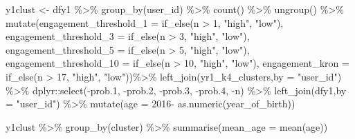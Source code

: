 \documentclass[
]{article}
\newenvironment{Shaded}{\begin{snugshade}}{\end{snugshade}}
\newcommand{\AttributeTok}[1]{\textcolor[rgb]{0.77,0.63,0.00}{#1}}
\newcommand{\DecValTok}[1]{\textcolor[rgb]{0.00,0.00,0.81}{#1}}
\newcommand{\FloatTok}[1]{\textcolor[rgb]{0.00,0.00,0.81}{#1}}
\newcommand{\FunctionTok}[1]{\textcolor[rgb]{0.00,0.00,0.00}{#1}}
\newcommand{\NormalTok}[1]{#1}
\newcommand{\OtherTok}[1]{\textcolor[rgb]{0.56,0.35,0.01}{#1}}
\newcommand{\SpecialCharTok}[1]{\textcolor[rgb]{0.00,0.00,0.00}{#1}}
\newcommand{\StringTok}[1]{\textcolor[rgb]{0.31,0.60,0.02}{#1}}
\begin{document}
\begin{Shaded}
\begin{Highlighting}[]
\NormalTok{y1clust }\OtherTok{\textless{}{-}}\NormalTok{ dfy1 }\SpecialCharTok{\%\textgreater{}\%}
  \FunctionTok{group\_by}\NormalTok{(user\_id) }\SpecialCharTok{\%\textgreater{}\%}
  \FunctionTok{count}\NormalTok{() }\SpecialCharTok{\%\textgreater{}\%}
  \FunctionTok{ungroup}\NormalTok{() }\SpecialCharTok{\%\textgreater{}\%} 
  \FunctionTok{mutate}\NormalTok{(}\AttributeTok{engagement\_threshold\_1 =} \FunctionTok{if\_else}\NormalTok{(n }\SpecialCharTok{\textgreater{}} \DecValTok{1}\NormalTok{, }\StringTok{"high"}\NormalTok{, }\StringTok{"low"}\NormalTok{),}
         \AttributeTok{engagement\_threshold\_3 =} \FunctionTok{if\_else}\NormalTok{(n }\SpecialCharTok{\textgreater{}} \DecValTok{3}\NormalTok{, }\StringTok{"high"}\NormalTok{, }\StringTok{"low"}\NormalTok{),}
         \AttributeTok{engagement\_threshold\_5 =} \FunctionTok{if\_else}\NormalTok{(n }\SpecialCharTok{\textgreater{}} \DecValTok{5}\NormalTok{, }\StringTok{"high"}\NormalTok{, }\StringTok{"low"}\NormalTok{),}
         \AttributeTok{engagement\_threshold\_10 =} \FunctionTok{if\_else}\NormalTok{(n }\SpecialCharTok{\textgreater{}} \DecValTok{10}\NormalTok{, }\StringTok{"high"}\NormalTok{, }\StringTok{"low"}\NormalTok{),}
         \AttributeTok{engagement\_kron =} \FunctionTok{if\_else}\NormalTok{(n }\SpecialCharTok{\textgreater{}} \DecValTok{17}\NormalTok{, }\StringTok{"high"}\NormalTok{, }\StringTok{"low"}\NormalTok{))}\SpecialCharTok{\%\textgreater{}\%} 
  \FunctionTok{left\_join}\NormalTok{(yr1\_k4\_clusters,}\AttributeTok{by =} \StringTok{"user\_id"}\NormalTok{) }\SpecialCharTok{\%\textgreater{}\%} 
\NormalTok{  dplyr}\SpecialCharTok{::}\FunctionTok{select}\NormalTok{(}\SpecialCharTok{{-}}\NormalTok{prob}\FloatTok{.1}\NormalTok{,}
          \SpecialCharTok{{-}}\NormalTok{prob}\FloatTok{.2}\NormalTok{,}
          \SpecialCharTok{{-}}\NormalTok{prob}\FloatTok{.3}\NormalTok{,}
          \SpecialCharTok{{-}}\NormalTok{prob}\FloatTok{.4}\NormalTok{,}
          \SpecialCharTok{{-}}\NormalTok{n) }\SpecialCharTok{\%\textgreater{}\%} 
  \FunctionTok{left\_join}\NormalTok{(dfy1,}\AttributeTok{by =} \StringTok{"user\_id"}\NormalTok{) }\SpecialCharTok{\%\textgreater{}\%} 
  \FunctionTok{mutate}\NormalTok{(}\AttributeTok{age =} \DecValTok{2016}\SpecialCharTok{{-}} \FunctionTok{as.numeric}\NormalTok{(year\_of\_birth))}

\NormalTok{y1clust }\SpecialCharTok{\%\textgreater{}\%}
  \FunctionTok{group\_by}\NormalTok{(cluster) }\SpecialCharTok{\%\textgreater{}\%}
  \FunctionTok{summarise}\NormalTok{(}\AttributeTok{mean\_age =} \FunctionTok{mean}\NormalTok{(age))}


\end{Highlighting}
\end{Shaded}
\end{document}

